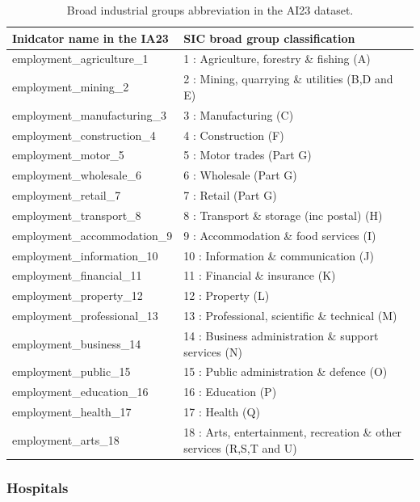 \documentclass{article}
\begin{document}
\begin{table}[!h]

\caption{\label{tab:unnamed-chunk-3}Broad industrial groups abbreviation in the AI23 dataset.}
\centering
\begin{tabu} to 
\toprule
Inidcator name in the IA23 & SIC broad group classification\\
\midrule
employment\_agriculture\_1 & 1 : Agriculture, forestry \& fishing (A)\\
employment\_mining\_2 & 2 : Mining, quarrying \& utilities (B,D and E)\\
employment\_manufacturing\_3 & 3 : Manufacturing (C)\\
employment\_construction\_4 & 4 : Construction (F)\\
employment\_motor\_5 & 5 : Motor trades (Part G)\\
\addlinespace
employment\_wholesale\_6 & 6 : Wholesale (Part G)\\
employment\_retail\_7 & 7 : Retail (Part G)\\
employment\_transport\_8 & 8 : Transport \& storage (inc postal) (H)\\
employment\_accommodation\_9 & 9 : Accommodation \& food services (I)\\
employment\_information\_10 & 10 : Information \& communication (J)\\
\addlinespace
employment\_financial\_11 & 11 : Financial \& insurance (K)\\
employment\_property\_12 & 12 : Property (L)\\
employment\_professional\_13 & 13 : Professional, scientific \& technical (M)\\
employment\_business\_14 & 14 : Business administration \& support services (N)\\
employment\_public\_15 & 15 : Public administration \& defence (O)\\
\addlinespace
employment\_education\_16 & 16 : Education (P)\\
employment\_health\_17 & 17 : Health (Q)\\
employment\_arts\_18 & 18 : Arts, entertainment, recreation \& other services (R,S,T and U)\\
\bottomrule
\end{tabu}
\end{table}

\hypertarget{hospitals}{%
\subsubsection{Hospitals}\label{hospitals}}
\end{document}
